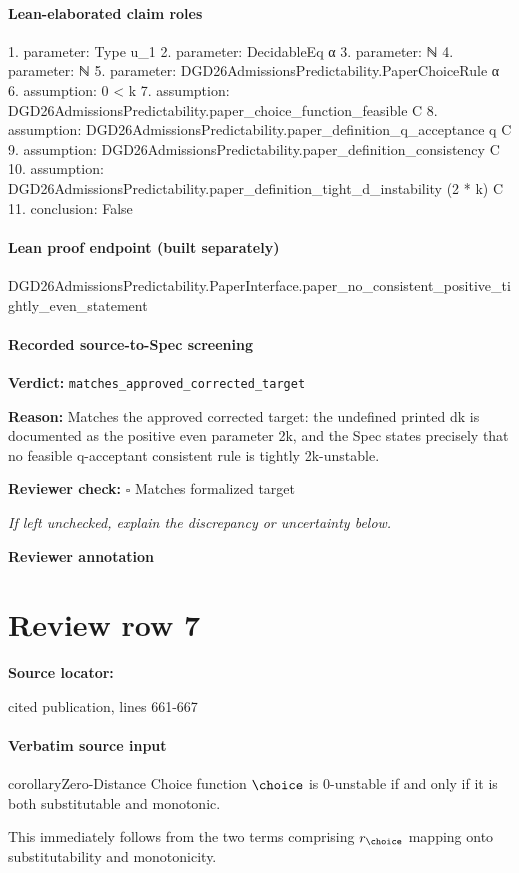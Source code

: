 \documentclass[10pt]{article}
\newcommand{\reviewerbox}{%
  \par\noindent\fbox{\parbox{0.96\linewidth}{\rule{0pt}{0.38in}}}\par
}
\newcommand{\reviewmatch}[1]{%
  \par\noindent\textbf{Reviewer check:} $\square$\; #1\par
  \noindent\emph{If left unchecked, explain the discrepancy or uncertainty below.}\par
}
\begin{document}
\paragraph{Lean-elaborated claim roles}\begin{ReviewVerbatim}
1. parameter: Type u_1
2. parameter: DecidableEq α
3. parameter: ℕ
4. parameter: ℕ
5. parameter: DGD26AdmissionsPredictability.PaperChoiceRule α
6. assumption: 0 < k
7. assumption: DGD26AdmissionsPredictability.paper_choice_function_feasible C
8. assumption: DGD26AdmissionsPredictability.paper_definition_q_acceptance q C
9. assumption: DGD26AdmissionsPredictability.paper_definition_consistency C
10. assumption: DGD26AdmissionsPredictability.paper_definition_tight_d_instability (2 * k) C
11. conclusion: False
\end{ReviewVerbatim}

\paragraph{Lean proof endpoint (built separately)}\begin{ReviewVerbatim}
DGD26AdmissionsPredictability.PaperInterface.paper_no_consistent_positive_tightly_even_statement
\end{ReviewVerbatim}

\paragraph{Recorded source-to-Spec screening}
\textbf{Verdict:} \texttt{matches\_approved\_corrected\_target}
\\
{\raggedright
\textbf{Reason:} Matches the approved corrected target:\allowbreak{} the undefined printed dk is documented as the positive even parameter 2k, and the Spec states precisely that no feasible q-\allowbreak{}acceptant consistent rule is tightly 2k-\allowbreak{}unstable.\allowbreak{}
\par}
\reviewmatch{Matches formalized target}
\noindent\textbf{Reviewer annotation}\par
\reviewerbox
\clearpage
\hypertarget{source-claim-1daa198b9d0a1bc3}{}
\section*{Review row 7}
\textbf{Source locator:} {\footnotesize\raggedright cited publication, lines 661-\allowbreak{}667\par}
\paragraph{Verbatim source input}
\begin{ReviewVerbatim}
\begin{restatable}{corollary}{Zero-Distance}
\label{thm:sub-mon-zero}
Choice function $\choice$ is 0-unstable if and only if it is both substitutable and monotonic.
\end{restatable}


This immediately follows from the two terms comprising $r_\choice$ mapping onto substitutability and monotonicity.
\end{ReviewVerbatim}
\end{document}
